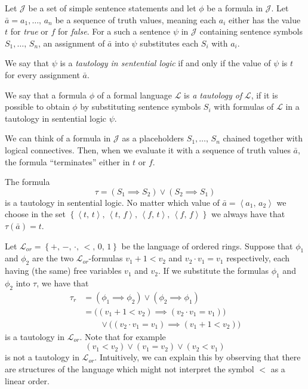 \documentclass[../../main.tex]{subfiles}
\begin{document}
\begin{definition}[Tautology]\cite[pp.8, 24]{Cha90}
    Let $\mathcal{J}$ be a set of simple sentence statements and let $\phi$ be a formula in $\mathcal{J}$.
    Let $\bar{a} = a_1,\ldots,\, a_n$ be a sequence of truth values, meaning each $a_i$ either has the value $t$ for \textit{true} or $f$ for \textit{false}.
    For a such a sentence $\psi$ in $\mathcal{J}$ containing sentence symbols $S_1,\ldots,\, S_n$, 
    an assignment of $\bar{a}$ into $\psi$ substitutes each $S_i$ with $a_i$.

    We say that $\psi$ is a \textit{tautology in sentential logic} if and only if the value of $\psi$ is $t$ for every assignment $\bar{a}$.

    We say that a formula $\phi$ of a formal language $\mathcal{L}$ is \textit{a tautology of} $\mathcal{L}$, 
    if it is possible to obtain $\phi$ by substituting sentence symbols $S_i$ with formulas of $\mathcal{L}$ in a tautology in sentential logic $\psi$. 
\end{definition}

We can think of a formula in $\mathcal{J}$ as a placeholders $S_1,\ldots,\, S_n$ chained together with logical connectives.
Then, when we evaluate it with a sequence of truth values $\bar{a}$, the formula ``terminates'' either in $t$ or $f$.

\begin{example}
    The formula $$\tau = \left(S_1 \implies S_2\right) \vee \left(S_2 \implies S_1\right)$$
    is a tautology in sentential logic.
    No matter which value of $\bar{a} = \left<a_1,\, a_2\right>$ we choose in the set 
    $\left\{\left<t,\, t\right>,\, \left<t,\, f\right>,\, \left<f,\, t\right>,\, \left<f,\, f\right>\right\}$ 
    we always have that $\tau(\bar{a}) = t$.

    Let $\mathcal{L}_{or} = \left\{+,\, -,\, \cdot,\, <,\, 0,\, 1\right\}$ be the language of ordered rings.
    Suppose that $\phi_1$ and $\phi_2$ are the two $\mathcal{L}_{or}$-formulas $v_1 + 1 < v_2$ and $v_2 \cdot v_1 = v_1$ respectively,
    each having (the same) free variables $v_1$ and $v_2$.
    If we substitute the formulas $\phi_1$ and $\phi_2$ into $\tau$, we have that
    \begin{align*}
        \tau_r
        &= \left(\phi_1 \implies \phi_2\right) \vee \left(\phi_2 \implies \phi_1\right) \\
        &= \big(\left(v_1 + 1 < v_2\right) \implies \left(v_2 \cdot v_1 = v_1\right)\big) \\
        &  \qquad \vee \big(\left(v_2 \cdot v_1 = v_1\right) \implies \left(v_1 + 1 < v_2\right)\big)
    \end{align*}
    is a tautology in $\mathcal{L}_{or}$.
    Note that for example $$(v_1 < v_2) \vee (v_1 = v_2) \vee (v_2 < v_1)$$ is not a tautology in $\mathcal{L}_{or}$.
    Intuitively, we can explain this by observing that there are structures of the language which might not interpret the symbol $<$ as a linear order.
\end{example}
\end{document}
